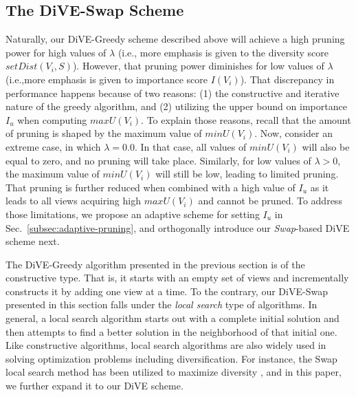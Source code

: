 

\subsection{The DiVE-Swap Scheme}
\label{subsec:dive-swap}

Naturally, our DiVE-Greedy scheme described above will achieve a high pruning power for high values of $\lambda$ (i.e., more emphasis is given to the diversity score $setDist(V_i,S)$).
%
However, that pruning power diminishes for low values of $\lambda$ (i.e.,more emphasis is given to importance score $I(V_i)$).
%
That discrepancy in performance happens because of two reasons: 
%
(1) the constructive and iterative nature of the greedy algorithm, and (2) utilizing the upper bound on importance $I_u$ when computing $maxU(V_i)$. 
%
To explain those reasons, recall that the amount of pruning is shaped by the maximum value of $minU(V_i)$.
%
Now, consider an extreme case, in which $\lambda = 0.0$. 
%
In that case, all values of $minU(V_i)$ will also be equal to zero, and no pruning will take place. 
%
Similarly, for low values of $\lambda > 0$, the maximum value of $minU(V_i)$ will still be low, leading to limited pruning. 
%
That pruning is further reduced when combined with a high value of $I_u$ as it leads to all views acquiring high $maxU(V_i)$ and cannot be pruned.  
%
To address those limitations, we propose an adaptive scheme for setting $I_u$ in Sec.~\ref{subsec:adaptive-pruning}, and  orthogonally introduce our {\em Swap}-based DiVE scheme next.


The DiVE-Greedy algorithm presented in the previous section is of the constructive type. 
%
That is, it starts with an empty set of views and incrementally constructs it by adding one view at a time. 
%
To the contrary, our DiVE-Swap presented in this section falls under the {\em local search} type of algorithms. 
%
In general, a local search algorithm starts out with a complete initial solution and then attempts to find a better solution in the neighborhood of that initial one. 
%
Like constructive algorithms, local search algorithms are also widely used in solving optimization problems including diversification. 
%
For instance, the Swap local search method has been utilized to maximize diversity \cite{Drosou, Vieira2011}, and in this paper, we further expand it to our DiVE scheme. 

